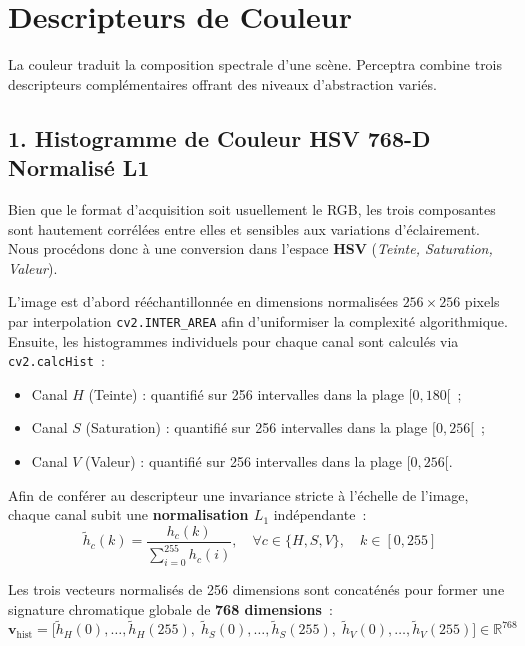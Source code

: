 \section{Descripteurs de Couleur}

La couleur traduit la composition spectrale d'une scène. Perceptra combine trois descripteurs complémentaires offrant des niveaux d'abstraction variés.

\subsection{1. Histogramme de Couleur HSV 768-D Normalisé L1}
Bien que le format d'acquisition soit usuellement le RGB, les trois composantes sont hautement corrélées entre elles et sensibles aux variations d'éclairement. Nous procédons donc à une conversion dans l'espace \textbf{HSV} (\textit{Teinte, Saturation, Valeur}).

L'image est d'abord rééchantillonnée en dimensions normalisées $256 \times 256$ pixels par interpolation \texttt{cv2.INTER\_AREA} afin d'uniformiser la complexité algorithmique. Ensuite, les histogrammes individuels pour chaque canal sont calculés via \texttt{cv2.calcHist}~:
\begin{itemize}
    \item Canal $H$ (Teinte) : quantifié sur 256 intervalles dans la plage $[0, 180[$~;
    \item Canal $S$ (Saturation) : quantifié sur 256 intervalles dans la plage $[0, 256[$~;
    \item Canal $V$ (Valeur) : quantifié sur 256 intervalles dans la plage $[0, 256[$.
\end{itemize}

Afin de conférer au descripteur une invariance stricte à l'échelle de l'image, chaque canal subit une \textbf{normalisation $L_1$} indépendante~:
\begin{equation}
\tilde{h}_c(k) = \frac{h_c(k)}{\sum_{i=0}^{255} h_c(i)}, \quad \forall c \in \{H, S, V\}, \quad k \in [0, 255]
\end{equation}

Les trois vecteurs normalisés de 256 dimensions sont concaténés pour former une signature chromatique globale de \textbf{768 dimensions}~:
\begin{equation}
\mathbf{v}_{\text{hist}} = \big[ \tilde{h}_H(0), \dots, \tilde{h}_H(255), \; \tilde{h}_S(0), \dots, \tilde{h}_S(255), \; \tilde{h}_V(0), \dots, \tilde{h}_V(255) \big] \in \mathbb{R}^{768}
\end{equation}

